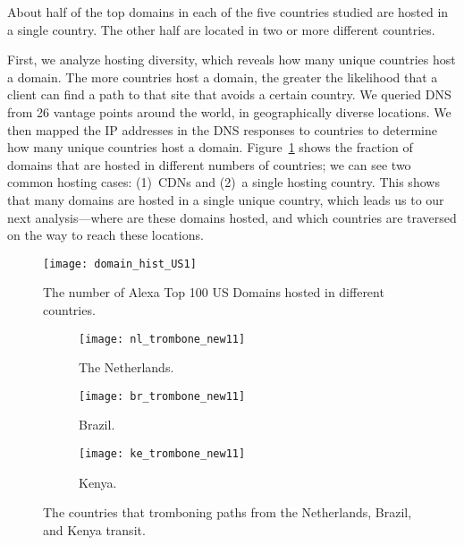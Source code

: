 \begin{finding} About half of the top domains in each of
the five countries studied are hosted in a single country.  The other half are
located in two or more different countries. \end{finding} 

\noindent First, we analyze hosting diversity, which reveals how many unique
countries host a domain.  The more countries host a domain, the greater the
likelihood that a client can find a path to that site that avoids a certain
country. We queried DNS from 26 vantage points around the world, in
geographically diverse locations. We then mapped the IP addresses in the DNS
responses to countries to determine how many unique countries host a domain.
Figure~\ref{fig:host_diversity} shows the fraction of domains that are hosted
in different numbers of countries; we can see two common hosting cases:
(1)~CDNs and (2)~a single hosting country.  This shows that many domains are
hosted in a single unique country, which leads us to our next analysis---where
are these domains hosted, and which countries are traversed on the way to
reach these locations.


\begin{figure}[t]
\centering
\texttt{[image: domain\_hist\_US1]}
\caption{The number of Alexa Top 100 US Domains hosted in different countries.}
\label{fig:host_diversity}
\end{figure}


\begin{figure*}[t!]
\begin{minipage}{\linewidth}
\begin{subfigure}[b]{.32\linewidth}
\texttt{[image: nl\_trombone\_new11]}
\caption{The Netherlands.\label{fig:trombone_netherlands}}
\end{subfigure}
\begin{subfigure}[b]{.32\linewidth}
\texttt{[image: br\_trombone\_new11]}
\caption{Brazil.\label{fig:trombone_brazil}}
\end{subfigure}
\begin{subfigure}[b]{.32\linewidth}
\texttt{[image: ke\_trombone\_new11]}
\caption{Kenya.\label{fig:trombone_kenya}}
\end{subfigure}
\end{minipage}
\caption{The countries that tromboning paths from the Netherlands, Brazil, and Kenya transit.}
\label{fig:trombone}
\end{figure*}



